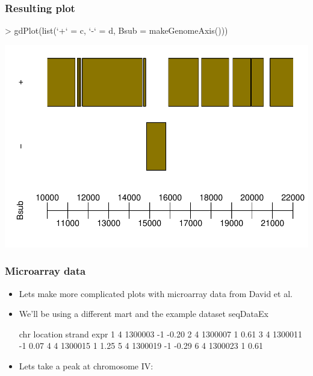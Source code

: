 \begin{frame}
  \frametitle{Resulting plot}
\begin{Schunk}
\begin{Sinput}
> gdPlot(list(`+` = c, `-` = d, Bsub = makeGenomeAxis()))
\end{Sinput}
\end{Schunk}
\includegraphics{plots/fig-023}
\end{frame}

\begin{frame}
  \frametitle{Microarray data}
  \begin{itemize}
  \item Lets make more complicated plots with microarray data from David et al.
  \item We'll be using a different mart and the example dataset \alert{seqDataEx}
\begin{Schunk}
\begin{Soutput}
  chr location strand  expr
1   4  1300003     -1 -0.20
2   4  1300007      1  0.61
3   4  1300011     -1  0.07
4   4  1300015      1  1.25
5   4  1300019     -1 -0.29
6   4  1300023      1  0.61
\end{Soutput}
\end{Schunk}
  \item Lets take a peak at chromosome IV:
  \end{itemize}
\end{frame}

